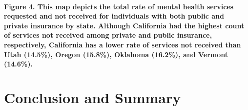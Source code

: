 \documentclass[
  12pt,
]{article}
\begin{document}
\hypertarget{figure-4.-this-map-depicts-the-total-rate-of-mental-health-services-requested-and-not-received-for-individuals-with-both-public-and-private-insurance-by-state.-although-california-had-the-highest-count-of-services-not-received-among-private-and-public-insurance-respectively-california-has-a-lower-rate-of-services-not-received-than-utah-14.5-oregon-15.8-oklahoma-16.2-and-vermont-14.6.}{%
\paragraph{Figure 4. This map depicts the total rate of mental health
services requested and not received for individuals with both public and
private insurance by state. Although California had the highest count of
services not received among private and public insurance, respectively,
California has a lower rate of services not received than Utah (14.5\%),
Oregon (15.8\%), Oklahoma (16.2\%), and Vermont
(14.6\%).}\label{figure-4.-this-map-depicts-the-total-rate-of-mental-health-services-requested-and-not-received-for-individuals-with-both-public-and-private-insurance-by-state.-although-california-had-the-highest-count-of-services-not-received-among-private-and-public-insurance-respectively-california-has-a-lower-rate-of-services-not-received-than-utah-14.5-oregon-15.8-oklahoma-16.2-and-vermont-14.6.}}

\hypertarget{conclusion-and-summary}{%
\section{Conclusion and Summary}\label{conclusion-and-summary}}
\end{document}
